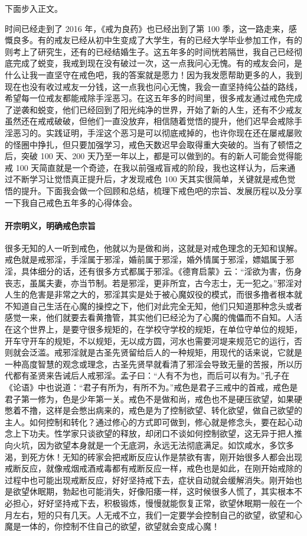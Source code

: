 下面步入正文。

时间已经走到了 2016 年，《戒为良药》也已经出到了第 100 季，这一路走来，感慨良多。有的戒友已经从初中生变成了大学生，有的已经大学毕业参加工作，有的则考上了研究生，还有的已经结婚生子。这五年多的时间恍若隔世，我自己已经彻底完成了蜕变，我戒到现在没有破过一次，这一点我问心无愧。有的戒友会问，是什么让我一直坚守在戒色吧，我的答案就是愿力！因为我发愿帮助更多的人，我到现在也没有收过戒友一分钱，这一点我也问心无愧，我会一直坚持纯公益的路线，希望每一位戒友都能戒除手淫恶习。在这五年多的时间里，很多戒友通过戒色完成了逆袭和蜕变，他们已经回到了阳光纯净的世界，开始了新的人生，还有不少戒友虽然还在戒戒破破，但他们一直没放弃，相信随着觉悟的提升，他们迟早会戒除手淫恶习的。实践证明，手淫这个恶习是可以彻底戒掉的，也许你现在还在屡戒屡败的怪圈中挣扎，但只要加强学习，戒色天数迟早会取得重大突破的。当有了顿悟之后，突破 100 天、200 天乃至一年以上，都是可以做到的。有的新人可能会觉得能戒 100 天简直就是一个奇迹，在我以前强戒盲戒的阶段，我也这样认为，后来通过不断学习让觉悟真正提升后，才发现戒色 100 天其实很简单，关键就是戒色觉悟的提升。下面我会做一个回顾和总结，梳理下戒色吧的宗旨、发展历程以及分享一下我自己戒色五年多的心得体会。

\paragraph{开宗明义，明确戒色宗旨}

很多无知的人一听到戒色，他就以为是做和尚，这就是对戒色理念的无知和误解。戒色就是戒邪淫，手淫属于邪淫，婚前属于邪淫，婚外情属于邪淫，嫖娼属于邪淫，具体细分的话，还有很多方式都属于邪淫。《德育启蒙》云：“淫欲为害，伤身丧志，虽属夫妻，亦当节制。若是邪淫，更非所宜，古今志士，无一犯之。”邪淫对人生的危害是非常之大的，邪淫其实是处于被心魔奴役的模式，而很多撸者根本就不知道自己生活在心魔的操控之下，他们对此完全无知，他们只知道那种念头或者感觉一来，他们就要去看黄撸管，其实他们已经沦为了心魔的傀儡而不自知。人活在这个世界上，是要守很多规矩的，在学校守学校的规矩，在单位守单位的规矩，开车守开车的规矩，不以规矩，无以成方圆，河水也需要河堤来规范它的运行，否则就会泛滥。戒邪淫就是古圣先贤留给后人的一种规矩，用现代的话来说，它就是一种高度智慧的观念或理念，古圣先贤早就看清了邪淫会导致无量的苦报，所以历代都有圣贤来告诫后人戒邪淫。孟子曰：“人有不为也，而后可以有为。”孔子在《论语》中也说道：“君子有所为，有所不为。”戒色是君子三戒中的首戒，戒色是君子第一修为，色是少年第一关。戒色不是做和尚，戒色也不是硬压欲望，如果硬憋着不撸，这样是会憋出病来的，戒色是为了控制欲望、转化欲望，做自己欲望的主人。如何控制和转化？通过修心的方式即可做到，修心就是修念头，要在起心动念上下功夫。性学家只谈欲望的释放，却闭口不谈如何控制欲望，这无异于把人推向火坑，因为欲望本身就是一个无底洞，永远无法彻底满足。如饮咸水，多饮多渴，到死方休！无知的砖家会把戒断反应认作是禁欲有害，刚开始很多人都会出现戒断反应，就像戒烟戒酒戒毒都有戒断反应一样，戒色也是如此，在刚开始戒除的过程中也可能出现戒断反应，好好坚持戒下去，症状自动就会缓解消失。刚开始也是欲望休眠期，勃起也可能消失，好像阳痿一样，这时候很多人慌了，其实根本不必担心，好好坚持戒下去，积极锻炼，慢慢就能恢复正常，欲望休眠期一般在一个月左右，短的只有几天。人无戒不立，我们一定要学会控制自己的欲望，欲望和心魔是一体的，你控制不住自己的欲望，欲望就会变成心魔！

